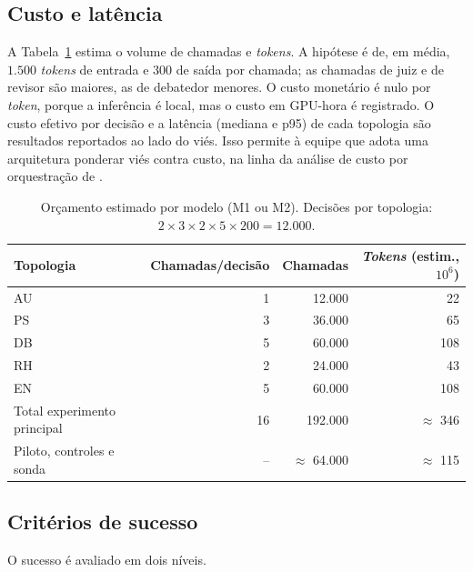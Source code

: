 \documentclass[12pt]{article}
\begin{document}
\subsection{Custo e latência}
\label{sec:custo}

A Tabela~\ref{tab:custo} estima o volume de chamadas e \textit{tokens}. A hipótese é de, em média, $1.500$ \textit{tokens} de entrada e $300$ de saída por chamada; as chamadas de juiz e de revisor são maiores, as de debatedor menores. O custo monetário é nulo por \textit{token}, porque a inferência é local, mas o custo em GPU-hora é registrado. O custo efetivo por decisão e a latência (mediana e p95) de cada topologia são resultados reportados ao lado do viés. Isso permite à equipe que adota uma arquitetura ponderar viés contra custo, na linha da análise de custo por orquestração de \citet{sayedali2026harness}.

\begin{table}[ht]
\centering
\footnotesize
\caption{Orçamento estimado por modelo (M1 ou M2). Decisões por topologia: $2\times3\times2\times5\times200=12.000$.}
\label{tab:custo}
\begin{tabular}{@{}lrrr@{}}
\toprule
Topologia & Chamadas/decisão & Chamadas & \textit{Tokens} (estim., $10^6$) \\
\midrule
AU & 1 & 12.000 & 22 \\
PS & 3 & 36.000 & 65 \\
DB & 5 & 60.000 & 108 \\
RH & 2 & 24.000 & 43 \\
EN & 5 & 60.000 & 108 \\
\midrule
Total experimento principal & 16 & 192.000 & $\approx$ 346 \\
Piloto, controles e sonda & -- & $\approx$ 64.000 & $\approx$ 115 \\
\bottomrule
\end{tabular}
\end{table}

\subsection{Critérios de sucesso}

O sucesso é avaliado em dois níveis.
\end{document}
